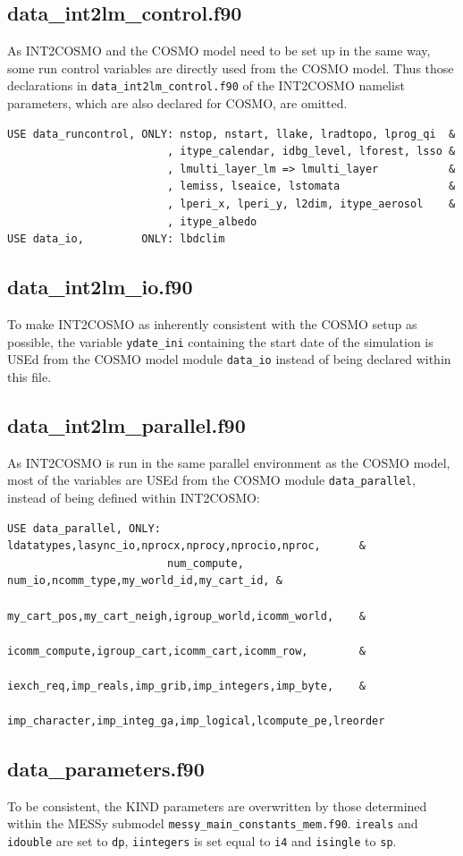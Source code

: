 \documentclass[11pt,twoside]{article}
\begin{document}
\subsection{data\_int2lm\_control.f90}
As INT2COSMO and the COSMO model need to be set up in the same way, 
some run control variables are directly used from the COSMO model. Thus those
declarations in \verb|data_int2lm_control.f90| of the 
INT2COSMO namelist parameters, which are also declared for COSMO, are omitted.
\begin{verbatim}
USE data_runcontrol, ONLY: nstop, nstart, llake, lradtopo, lprog_qi  &
                         , itype_calendar, idbg_level, lforest, lsso &
                         , lmulti_layer_lm => lmulti_layer           &
                         , lemiss, lseaice, lstomata                 &
                         , lperi_x, lperi_y, l2dim, itype_aerosol    &
                         , itype_albedo
USE data_io,         ONLY: lbdclim
\end{verbatim}

\subsection{data\_int2lm\_io.f90}
To make INT2COSMO as inherently consistent with the COSMO setup as possible,
the variable \verb|ydate_ini| containing the start date of the simulation
is USEd from the COSMO model module \verb|data_io| instead of being declared 
within this file.

\subsection{data\_int2lm\_parallel.f90}
As INT2COSMO is run in the same parallel environment as the COSMO model,
 most of the
variables are USEd from the COSMO module \verb|data_parallel|, instead of being
defined within INT2COSMO:
\begin{verbatim}
USE data_parallel, ONLY: ldatatypes,lasync_io,nprocx,nprocy,nprocio,nproc,      &
                         num_compute, num_io,ncomm_type,my_world_id,my_cart_id, &
                         my_cart_pos,my_cart_neigh,igroup_world,icomm_world,    &
                         icomm_compute,igroup_cart,icomm_cart,icomm_row,        &
                         iexch_req,imp_reals,imp_grib,imp_integers,imp_byte,    &
                         imp_character,imp_integ_ga,imp_logical,lcompute_pe,lreorder
\end{verbatim}

\subsection{data\_parameters.f90}
To be consistent, the KIND parameters are overwritten by those 
determined within the MESSy submodel \verb|messy_main_constants_mem.f90|.
 \verb|ireals| and \verb|idouble| are set to \verb|dp|, \verb|iintegers| 
is set equal to \verb|i4| and \verb|isingle| to \verb|sp|.
\end{document}
